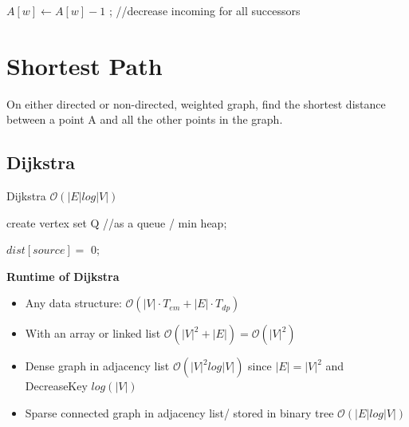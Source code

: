 \documentclass[9pt,landscape,a4paper, table]{extarticle}
\begin{document}
\begin{multicols*}{3}
{{\begin{algorithm}[H]
{{		$A[w] \leftarrow A[w] - 1$ ; //decrease incoming for all successors
		
	}
}
\end{algorithm}
}

}

\section{Shortest Path}
On either directed or non-directed, weighted graph, find the shortest distance between a point A and all the other points in the graph.

\subsection{Dijkstra}

{\scriptsize
\begin{algorithm}[H]
    \caption{Dijkstra $\mathcal{O}(|E|  log |V|) $}
    
    \SetAlgoLined
    create vertex set Q //as a queue / min heap;
    
    $dist[source] =$ 0;
    

\end{algorithm}}
\textbf{Runtime of Dijkstra}
\begin{itemize}
    \item Any data structure: $\mathcal{O}(|V|\cdot T_{em} + |E| \cdot T_{dp})$
    \item With an array or linked list $\mathcal{O}(|V|^2 + |E|) = \mathcal{O}(|V|^2) $
    \item Dense graph in adjacency list $\mathcal{O}(|V|^2 log |V|) $ since $|E| = |V|^2$ and DecreaseKey $log(|V|)$
    \item Sparse connected graph in adjacency list/ stored in binary tree $\mathcal{O}(|E|  log |V|) $
\end{itemize}


\end{multicols*}
\end{document}
